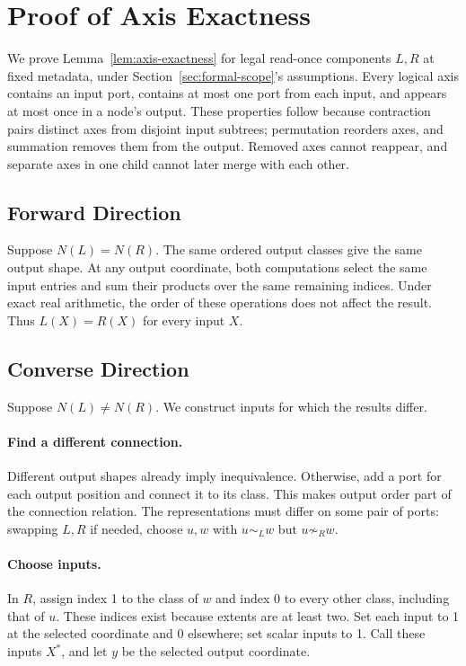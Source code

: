 \section{Proof of Axis Exactness}
\label{app:axis-exactness}
We prove Lemma~\ref{lem:axis-exactness} for legal read-once components $L,R$
at fixed metadata, under Section~\ref{sec:formal-scope}'s assumptions.
Every logical axis contains an input port, contains at most one port from
each input, and appears at most once in a node's output. These properties
follow because contraction pairs distinct axes from disjoint input subtrees;
permutation reorders axes, and summation removes them from the output.
Removed axes cannot reappear, and separate axes in one child cannot later
merge with each other.

\subsection{Forward Direction}
Suppose $N(L)=N(R)$. The same ordered output classes give the same output
shape. At any output coordinate, both computations select the same input
entries and sum their products over the same remaining indices. Under
exact real arithmetic, the order of these operations does not affect the
result. Thus $L(X)=R(X)$ for every input $X$.

\subsection{Converse Direction}
Suppose $N(L)\ne N(R)$. We construct inputs for which the results differ.

\paragraph{Find a different connection.}
Different output shapes already imply inequivalence. Otherwise, add a port
for each output position and connect it to its class. This makes output
order part of the connection relation. The representations must differ on
some pair of ports: swapping $L,R$ if needed, choose $u,w$ with
$u\sim_L w$ but $u\not\sim_R w$.

\paragraph{Choose inputs.}
In $R$, assign index 1 to the class of $w$ and index 0 to every other class,
including that of $u$. These indices exist because extents are at least two.
Set each input to 1 at the selected coordinate and 0 elsewhere; set scalar
inputs to 1. Call these inputs $X^*$, and let $y$ be the selected output
coordinate.

